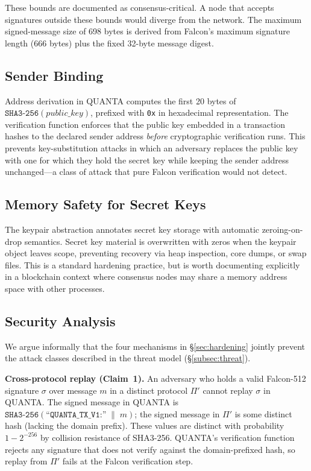 \documentclass[11pt,a4paper]{article}
\begin{document}
These bounds are documented as consensus-critical. A node that accepts
signatures outside these bounds would diverge from the network. The maximum
signed-message size of 698 bytes is derived from Falcon's maximum signature
length (666 bytes) plus the fixed 32-byte message digest.

\subsection{Sender Binding}

Address derivation in QUANTA computes the first 20 bytes of
$\texttt{SHA3-256}(\textit{public\_key})$, prefixed with \texttt{0x} in
hexadecimal representation. The verification function enforces that the public
key embedded in a transaction hashes to the declared sender address
\emph{before} cryptographic verification runs. This prevents key-substitution
attacks in which an adversary replaces the public key with one for which they
hold the secret key while keeping the sender address unchanged---a class of
attack that pure Falcon verification would not detect.

\subsection{Memory Safety for Secret Keys}

The keypair abstraction annotates secret key storage with automatic
zeroing-on-drop semantics. Secret key material is overwritten with zeros when
the keypair object leaves scope, preventing recovery via heap inspection, core
dumps, or swap files. This is a standard hardening practice, but is worth
documenting explicitly in a blockchain context where consensus nodes may share
a memory address space with other processes.

\subsection{Security Analysis}
\label{sec:security}

We argue informally that the four mechanisms in \S\ref{sec:hardening} jointly
prevent the attack classes described in the threat model (\S\ref{subsec:threat}).

\noindent\textbf{Cross-protocol replay (Claim~1).}
An adversary who holds a valid Falcon-512 signature $\sigma$ over message $m$
in a distinct protocol $\Pi'$ cannot replay $\sigma$ in QUANTA. The signed
message in QUANTA is $\texttt{SHA3-256}(\texttt{``QUANTA\_TX\_V1:''} \;\|\; m)$;
the signed message in $\Pi'$ is some distinct hash (lacking the domain
prefix). These values are distinct with probability $1 - 2^{-256}$ by
collision resistance of SHA3-256. QUANTA's verification function
rejects any signature that does not verify against the domain-prefixed hash,
so replay from $\Pi'$ fails at the Falcon verification step.
\end{document}
